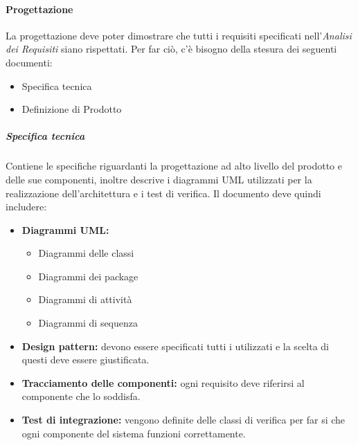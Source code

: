 \paragraph{Progettazione}
La progettazione deve poter dimostrare che tutti i requisiti specificati nell'\textit{Analisi dei Requisiti} siano rispettati. Per far ciò, c'è bisogno della stesura dei seguenti documenti:
\begin{itemize}
	\item Specifica tecnica
	\item Definizione di Prodotto
\end{itemize}

\subparagraph{Specifica tecnica}
Contiene le specifiche riguardanti la progettazione ad alto livello del prodotto e delle sue componenti, inoltre descrive i diagrammi UML utilizzati per la realizzazione dell'architettura e i test di verifica. Il documento deve quindi includere:
\begin{itemize}
	\item \textbf{Diagrammi UML:}
	\begin{itemize}
		\item Diagrammi delle classi
		\item Diagrammi dei package
		\item Diagrammi di attività
		\item Diagrammi di sequenza
	\end{itemize}
	\item \textbf{Design pattern:} devono essere specificati tutti i  utilizzati e la scelta di questi deve essere giustificata. 
	\item \textbf{Tracciamento delle componenti:} ogni requisito deve riferirsi al componente che lo soddisfa.
	\item \textbf{Test di integrazione:} vengono definite delle classi di verifica per far si che ogni componente del sistema funzioni correttamente.
\end{itemize}

